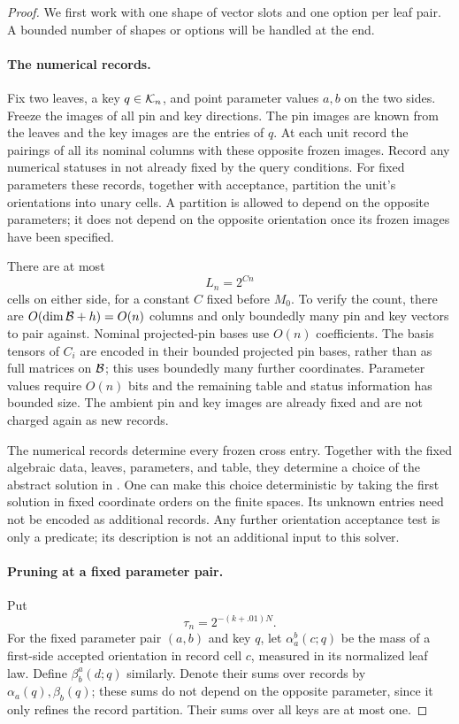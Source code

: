 \begin{proof}
We first work with one shape of vector slots and one option per
leaf pair.  A bounded number of shapes or options will be
handled at the end.

\paragraph{The numerical records.}
Fix two leaves, a key $q\in\mathcal K_n$, and point parameter values
$a,b$ on the two sides.  Freeze the images of all pin and key
directions.  The pin images are known from the leaves and the
key images are the entries of $q$.  At each unit record the
pairings of all its nominal columns with these opposite frozen
images.  Record any numerical statuses in
 not already fixed
by the query conditions.  For fixed parameters these records,
together with acceptance, partition the unit's orientations
into unary cells.  A partition is allowed to depend on the
opposite parameters; it does not depend on the opposite
orientation once its frozen images have been specified.

There are at most
\begin{equation}\label{eq:record-count}
 L_n=2^{Cn}
\end{equation}
cells on either side, for a constant $C$ fixed before $M_0$.
To verify the count, there are $O(\dim\mathcal B+h)=O(n)$ columns
and only boundedly many pin and key vectors to pair against.
Nominal projected-pin bases use $O(n)$ coefficients.  The
basis tensors of $C_i$ are encoded in their bounded projected
pin bases, rather than as full matrices on $\mathcal B$; this uses
boundedly many further coordinates.  Parameter values require
$O(n)$ bits and the remaining table and status information has
bounded size.  The ambient pin and key images are already
fixed and are not charged again as new records.

The numerical records determine every frozen cross entry.
Together with the fixed algebraic data, leaves, parameters,
and table, they determine a choice of the abstract solution
in .  One can make this choice
deterministic by taking the first solution in fixed coordinate
orders on the finite spaces.  Its unknown entries need not
be encoded as additional records.  Any further orientation
acceptance test is only a predicate; its description is not
an additional input to this solver.

\paragraph{Pruning at a fixed parameter pair.}
Put
\begin{equation}\label{eq:cell-threshold}
 \tau_n=2^{-(k+.01)N}.
\end{equation}
For the fixed parameter pair $(a,b)$ and key $q$, let
$\alpha_a^b(c;q)$ be the mass of a first-side accepted
orientation in record cell $c$, measured in its normalized
leaf law.  Define $\beta_b^a(d;q)$ similarly.  Denote their
sums over records by $\alpha_a(q),\beta_b(q)$; these sums
do not depend on the opposite parameter, since it only
refines the record partition.  Their sums over all keys
are at most one.


\end{proof}
